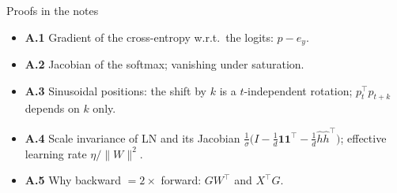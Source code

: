 \documentclass[11pt,aspectratio=169]{beamer}
\newcommand{\T}{^{\top}}
\begin{document}
\begin{frame}{Proofs in the notes}
  \begin{itemize}
    \item \textbf{A.1} Gradient of the cross-entropy w.r.t.\ the logits: $p - e_y$.
    \item \textbf{A.2} Jacobian of the softmax; vanishing under saturation.
    \item \textbf{A.3} Sinusoidal positions: the shift by $k$ is a $t$-independent rotation;
          $p_t\T p_{t+k}$ depends on $k$ only.
    \item \textbf{A.4} Scale invariance of LN and its Jacobian
          $\frac1\sigma\big(I - \frac1d\mathbf 1\mathbf 1\T - \frac1d\hat h\hat h\T\big)$;
          effective learning rate $\eta/\|W\|^2$.
    \item \textbf{A.5} Why backward $= 2\times$ forward: $GW\T$ and $X\T G$.
  \end{itemize}
\end{frame}
\end{document}
